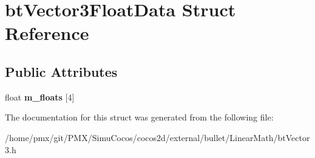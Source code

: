 \hypertarget{structbtVector3FloatData}{}\section{bt\+Vector3\+Float\+Data Struct Reference}
\label{structbtVector3FloatData}
\subsection*{Public Attributes}
\begin{DoxyCompactItemize}
\item 
\mbox{\label{structbtVector3FloatData_a819cd4c6a5d499fd63e754e77dcefbe7}} 
float {\bfseries m\+\_\+floats} \mbox{[}4\mbox{]}
\end{DoxyCompactItemize}


The documentation for this struct was generated from the following file\+:\begin{DoxyCompactItemize}
\item 
/home/pmx/git/\+P\+M\+X/\+Simu\+Cocos/cocos2d/external/bullet/\+Linear\+Math/bt\+Vector3.\+h\end{DoxyCompactItemize}
